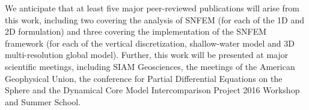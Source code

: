 \documentclass[11pt]{article}
\begin{document}
We anticipate that at least five major peer-reviewed publications will arise from this work, including two covering the analysis of SNFEM (for each of the 1D and 2D formulation) and three covering the implementation of the SNFEM framework (for each of the vertical discretization, shallow-water model and 3D multi-resolution global model). Further, this work will be presented at major scientific meetings, including SIAM Geosciences, the meetings of the American Geophysical Union, the conference for Partial Differential Equations on the Sphere and the Dynamical Core Model Intercomparison Project 2016 Workshop and Summer School.






%

{\vbox{}}
\end{document}
